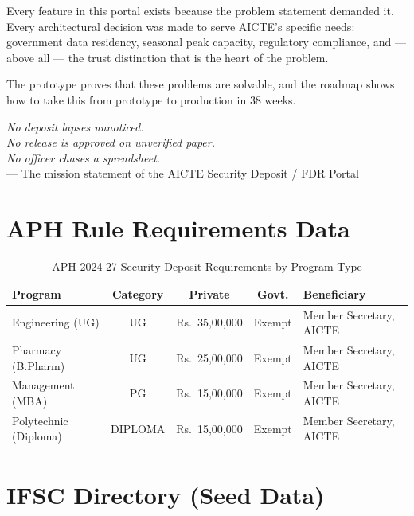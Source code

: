 \documentclass[12pt, a4paper]{report}
\newcommand{\rupee}{Rs.~}
\begin{document}
Every feature in this portal exists because the problem statement demanded it. Every architectural decision was made to serve AICTE's specific needs: government data residency, seasonal peak capacity, regulatory compliance, and --- above all --- the trust distinction that is the heart of the problem.

The prototype proves that these problems are solvable, and the roadmap shows how to take this from prototype to production in 38 weeks.

\begin{tcolorbox}[colback=aicteNavy!5!white, colframe=aicteNavy, title={\textbf{Final Statement}}]
\centering
\textit{No deposit lapses unnoticed.\\
No release is approved on unverified paper.\\
No officer chases a spreadsheet.}\\[0.5cm]
--- The mission statement of the AICTE Security Deposit / FDR Portal
\end{tcolorbox}


\appendix

\chapter{APH Rule Requirements Data}

\begin{table}[H]
\centering
\caption{APH 2024-27 Security Deposit Requirements by Program Type}
\begin{tabular}{|l|c|c|c|l|}
\hline
\textbf{Program} & \textbf{Category} & \textbf{Private} & \textbf{Govt.} & \textbf{Beneficiary} \\
\hline
Engineering (UG) & UG & \rupee 35,00,000 & Exempt & Member Secretary, AICTE \\
Pharmacy (B.Pharm) & UG & \rupee 25,00,000 & Exempt & Member Secretary, AICTE \\
Management (MBA) & PG & \rupee 15,00,000 & Exempt & Member Secretary, AICTE \\
Polytechnic (Diploma) & DIPLOMA & \rupee 15,00,000 & Exempt & Member Secretary, AICTE \\
\hline
\end{tabular}
\end{table}


\chapter{IFSC Directory (Seed Data)}
\end{document}
